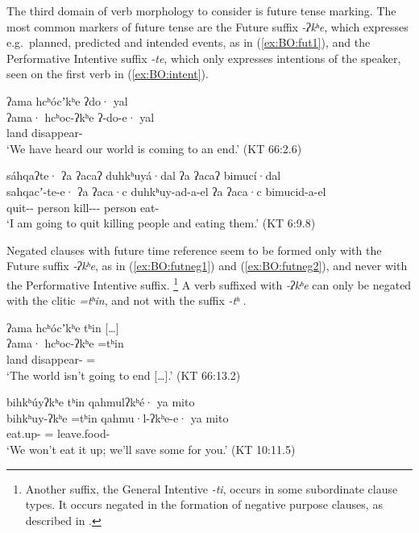 \documentclass[output=paper,modfonts,nonflat,colorlinks,citecolor=brown]{langscibook}
\begin{document}
The third domain of verb morphology to consider is future tense marking. The most common markers of future tense are the Future suffix \textit{-ʔkʰe}, which expresses e.g.\ planned, predicted and intended events, as in (\ref{ex:BO:fut1}), and the Performative Intentive suffix \textit{-te}, which only expresses intentions of the speaker, seen on the first verb in (\ref{ex:BO:intent}).

{%
\ea 
\label{ex:BO:fut1}
\glll ʔama hcʰócʼkʰe ʔdo· yal\\
    ʔama· hcʰoc-ʔkʰe ʔ-do-e· yal\\
    land disappear-  \\
\glt `We have heard our world is coming to an end.' ({KT 66:2.6})\\
\z
}%

\ea 
\label{ex:BO:intent}
\glll sáhqaʔte· ʔa ʔacaʔ duhkʰuyá·dal ʔa ʔacaʔ bimucí·dal\\
      sahqacʼ-te-e· ʔa ʔaca·c duhkʰuy-ad-a-el ʔa ʔaca·c bimucid-a-el\\
      quit--  person kill---  person eat-\\
\glt `I am going to quit killing people and eating them.' ({KT 6:9.8})\\
\z

\noindent Negated clauses with future time reference seem to be formed only with the Future suffix \textit{-ʔkʰe}, as in (\ref{ex:BO:futneg1}) and (\ref{ex:BO:futneg2}), and never with the Performative Intentive suffix.%
\footnote{
Another suffix, the General Intentive \textit{-ti}, occurs in some subordinate clause types. It occurs negated in the formation of negative purpose clauses, as described in .
} %
A verb suffixed with \textit{-ʔkʰe} can only be negated with the clitic \textit{=tʰin}, and not with the suffix \textit{-tʰ} \citep[258]{Oswalt1961}.

\ea 
\label{ex:BO:futneg1}
\glll ʔama hcʰócʼkʰe tʰin [\ldots]\\
    ʔama· hcʰoc-ʔkʰe =tʰin {}\\
    land disappear- = {}\\
\glt `The world isn’t going to end [\ldots].' ({KT 66:13.2})\\
\z

{%
\ea 
\label{ex:BO:futneg2}
\glll bihkʰúyʔkʰe tʰin qahmulʔkʰé· ya mito\\
    bihkʰuy-ʔkʰe =tʰin qahmu·l-ʔkʰe-e· ya mito\\
    eat.up- = leave.food-  \\
\glt `We won’t eat it up; we’ll save some for you.' ({KT 10:11.5})\\
\z
}%
\end{document}
